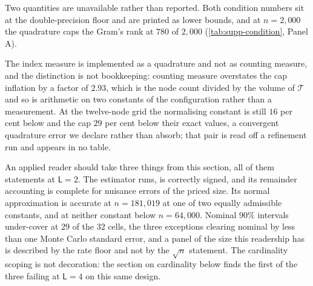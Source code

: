\documentclass[
  12pt]{article}
\newcommand{\1}[1]{\mathds{1}\left[#1\right]}
\theoremstyle{plain}
\theoremstyle{definition}
\theoremstyle{definition}
\theoremstyle{remark}
\begin{document}
Two quantities are unavailable rather than reported. Both condition numbers sit
at the double-precision floor and are printed as lower bounds, and at $n=2{,}000$
the quadrature caps the Gram's rank at $780$ of $2{,}000$ (\cref{tab:supp-condition}, Panel A).

The index measure is implemented as a quadrature and not as counting measure, and
the distinction is not bookkeeping: counting measure overstates the cap inflation
by a factor of $2.93$, which is the node count divided by the volume of
$\mathcal T$ and so is arithmetic on two constants of the configuration rather
than a measurement. At the twelve-node grid the normalising constant is still
$16$ per cent below and the cap $29$ per cent below their exact values, a
convergent quadrature error we declare rather than absorb; that pair is read off
a refinement run and appears in no table.

An applied reader should take three things from this section, all of them
statements at $\mathsf L=2$. The estimator runs,
is correctly signed, and its remainder accounting is complete for nuisance errors
of the priced size. Its normal approximation is accurate at $n=181{,}019$ at one
of two equally admissible constants, and at neither constant below $n=64{,}000$.
Nominal $90\%$ intervals under-cover at $29$ of the $32$ cells, the three
exceptions clearing nominal by less than one Monte Carlo standard error, and a
panel of the size
this readership has is described by the rate floor and not by the $\sqrt n$
statement. The cardinality scoping is not decoration: the section on cardinality below
finds the first of the three failing at $\mathsf L=4$ on this same design.

\end{document}
